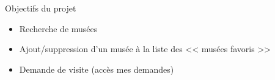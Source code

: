 \FlorentSpeak
\begin{frame}{Objectifs du projet} %
	\begin{itemize}
		\item Recherche de musées
		\vfill
		\item Ajout/suppression d'un musée à la liste des << musées favoris >>
		\vfill
		\item Demande de visite (accès mes demandes)
	\end{itemize}	
\end{frame}

